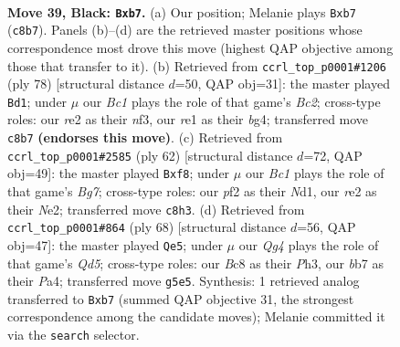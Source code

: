 \documentclass[11pt]{article}
\begin{document}
\clearpage

\begin{figure}[p]\centering
\begin{subfigure}{0.46\textwidth}\centering
\resizebox{\linewidth}{!}{%
\newchessgame
\chessboard[
  setfen={2b2k2/1B3p2/5np1/6qp/P7/6P1/1p1NRP1P/4R1K1 b - - 0 39},
  showmover=false,
  pgfstyle=straightmove, color=movearrow, markmove={c8-b7}
]}
\caption{}
\end{subfigure}\hfill
\begin{subfigure}{0.46\textwidth}\centering
\resizebox{\linewidth}{!}{%
\newchessgame
\chessboard[
  setfen={3R4/1p3rk1/p1p5/P3r3/1Q2p1b1/2P2n2/1PB2P2/5K2 w - - 10 40},
  showmover=false,
  pgfstyle=straightmove, color=movearrow, markmove={c2-d1}
]}
\caption{}
\end{subfigure}
\\[4pt]
\begin{subfigure}{0.46\textwidth}\centering
\resizebox{\linewidth}{!}{%
\newchessgame
\chessboard[
  setfen={r1r1kb2/5pB1/1q2p3/6Q1/8/p4P2/1P2N1PP/1K1N3R w - - 1 32},
  showmover=false,
  pgfstyle=straightmove, color=movearrow, markmove={g7-f8}
]}
\caption{}
\end{subfigure}\hfill
\begin{subfigure}{0.46\textwidth}\centering
\resizebox{\linewidth}{!}{%
\newchessgame
\chessboard[
  setfen={2rr2k1/5pp1/p6p/2nQ4/P2N4/5P1P/2P2KP1/8 w - - 1 35},
  showmover=false,
  pgfstyle=straightmove, color=movearrow, markmove={d5-e5}
]}
\caption{}
\end{subfigure}
\caption{\textbf{Move 39, Black: \texttt{Bxb7}.} (a) Our position; Melanie plays \texttt{Bxb7} (\texttt{c8b7}). Panels (b)--(d) are the retrieved master positions whose correspondence most drove this move (highest QAP objective among those that transfer to it). (b) Retrieved from \texttt{ccrl\_top\_p0001\#1206} (ply 78) [structural distance $d$=50, QAP obj=31]: the master played \texttt{Bd1}; under $\mu$ our \emph{Bc1} plays the role of that game's \emph{Bc2}; cross-type roles: our \emph{r}e2 as their \emph{n}f3, our \emph{r}e1 as their \emph{b}g4; transferred move \texttt{c8b7} \textbf{(endorses this move)}. (c) Retrieved from \texttt{ccrl\_top\_p0001\#2585} (ply 62) [structural distance $d$=72, QAP obj=49]: the master played \texttt{Bxf8}; under $\mu$ our \emph{Bc1} plays the role of that game's \emph{Bg7}; cross-type roles: our \emph{p}f2 as their \emph{N}d1, our \emph{r}e2 as their \emph{N}e2; transferred move \texttt{c8h3}. (d) Retrieved from \texttt{ccrl\_top\_p0001\#864} (ply 68) [structural distance $d$=56, QAP obj=47]: the master played \texttt{Qe5}; under $\mu$ our \emph{Qg4} plays the role of that game's \emph{Qd5}; cross-type roles: our \emph{B}c8 as their \emph{P}h3, our \emph{b}b7 as their \emph{P}a4; transferred move \texttt{g5e5}. Synthesis: 1 retrieved analog transferred to \texttt{Bxb7} (summed QAP objective 31, the strongest correspondence among the candidate moves); Melanie committed it via the \texttt{search} selector.}
\label{fig:thought-m77}
\end{figure}
\end{document}
